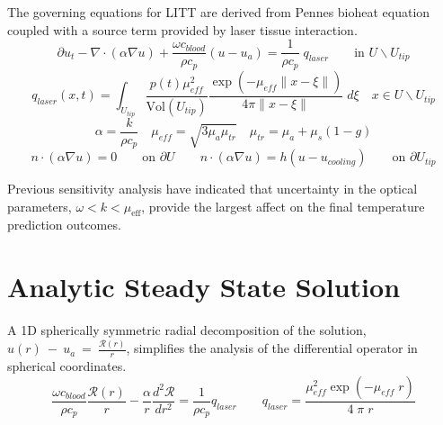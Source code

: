 \documentclass{article}         %
\theoremstyle{definition}
\theoremstyle{remark}
\begin{document}

The governing equations for LITT are derived from Pennes bioheat
equation coupled with a source term provided by laser tissue
interaction. 
\begin{equation} \label{BioheatPDE}
  \partial u_t   
 -\nabla \cdot  (   \alpha \nabla u  ) 
 + \frac{\omega c_\textit{blood}}{\rho c_p} (u  - u_a )
 = \frac{1}{\rho c_p} \; q_{laser}
     \qquad \text{in } U \backslash U_{tip}
\end{equation}
\[
   q_{laser}(x,t)  = 
    \int_{U_{tip}}
 \frac{p(t) \mu_\textit{eff}^2}{\text{Vol}(U_{tip}) }  
   \frac{ \exp(-\mu_\textit{eff} \| x -{ \xi}\|) }
      {4\pi \| x-{ \xi}\|} \; d\xi
   \quad   x \in U \backslash U_{tip}
\]
\[
  \alpha  = \frac{k}{\rho c_p}
\quad
  \mu_{eff}  = \sqrt{ 3 {\mu_a} \mu_{tr} }
\quad
 \mu_{tr} = \mu_a  + \mu_s (1-g)
\]
\[
n \cdot ( \alpha \nabla u  )  = 0 
                       \qquad \text{on } \partial U
\qquad
n \cdot ( \alpha \nabla u  )  = h (u - u_\textit{cooling}) 
                       \qquad \text{on } \partial U_\textit{tip}
\]

Previous sensitivity analysis have indicated that uncertainty in 
the optical parameters, $ \omega < k < \mu_\text{eff}$, 
provide the largest affect on the final temperature prediction outcomes.

\section{Analytic Steady State Solution}\label{AnalyticBioheatModel}

A 1D spherically symmetric radial decomposition 
of the solution,
$u(r)~-~u_a~=~\frac{\mathcal{R}(r)}{r}$, simplifies the analysis of the differential operator in
spherical coordinates.
\[
    \frac{\omega c_\textit{blood}}{\rho c_p}  \frac{ \mathcal{R}(r)}{r} 
   -
    \frac{\alpha }{r}   \frac{d^2 \mathcal{R}}{dr^2}
   = 
    \frac{1}{ \rho c_p} q_\textit{laser}
    \qquad
    q_\textit{laser} 
	=
	\frac{\mu_\textit{eff}^2 \exp \left(-\mu_\textit{eff} \; r \right) } {4 \; \pi \; r }
\]

\end{document}
